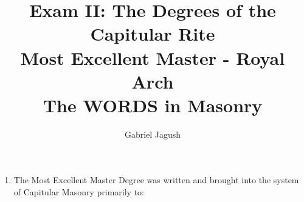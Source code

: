 \documentclass{article}
\title{Exam II: The Degrees of the Capitular Rite\\\large{Most Excellent Master - Royal Arch\\The WORDS in Masonry}}
\author{Gabriel Jagush}
\begin{document}
	\maketitle

	\begin{enumerate}
		\item The Most Excellent Master Degree was written and brought into the system of Capitular Masonry primarily to:
	\end{enumerate}
\end{document}
